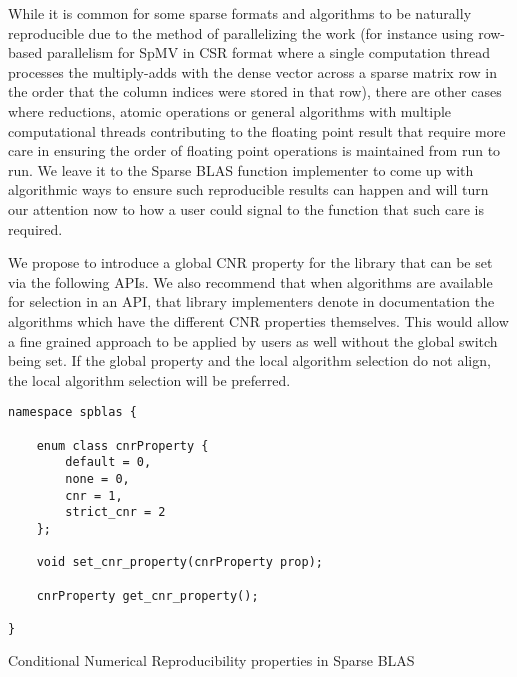 \documentclass{article}
\begin{document}
While it is common for some sparse formats and algorithms to be naturally reproducible due to the method of parallelizing the work (for instance using row-based parallelism for SpMV in CSR format where a single computation thread processes the multiply-adds with the dense vector across a sparse matrix row in the order that the column indices were stored in that row), there are other cases where reductions, atomic operations or general algorithms with multiple computational threads contributing to the floating point result that require more care in ensuring the order of floating point operations is maintained from run to run.  We leave it to the Sparse BLAS function implementer to come up with algorithmic ways to ensure such reproducible results can happen and will turn our attention now to how a user could signal to the function that such care is required.

We propose to introduce a global CNR property for the library that can be set via the following APIs. We also recommend that when algorithms are available for selection in an API, that library implementers denote in documentation the  algorithms which have the different CNR properties themselves.  This would allow a fine grained approach to be applied by users as well without the global switch being set. If the global property and the local algorithm selection do not align, the local algorithm selection will be preferred.

\begin{listing}[H]
\begin{verbatim}
namespace spblas {

    enum class cnrProperty {
        default = 0,
        none = 0,
        cnr = 1,
        strict_cnr = 2
    };

    void set_cnr_property(cnrProperty prop); 

    cnrProperty get_cnr_property();

}
\end{verbatim}
\caption{Conditional Numerical Reproducibility properties in Sparse BLAS}
\end{listing}

\iffalse

\end{document}
